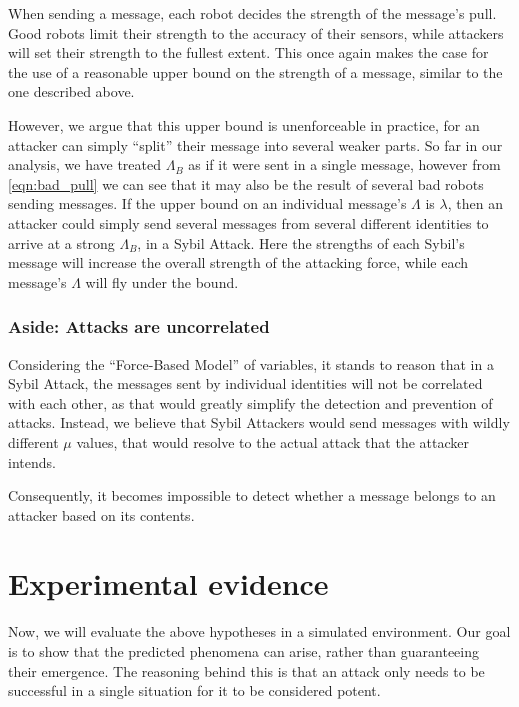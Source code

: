 When sending a message, each robot decides the strength of the message's pull. Good robots limit their strength to the accuracy of their sensors, while attackers will set their strength to the fullest extent. This once again makes the case for the use of a reasonable upper bound on the strength of a message, similar to the one described above.

However, we argue that this upper bound is unenforceable in practice, for an attacker can simply ``split'' their message into several weaker parts. So far in our analysis, we have treated $\Lambda_B$ as if it were sent in a single message, however from \autoref{eqn:bad_pull} we can see that it may also be the result of several bad robots sending messages. If the upper bound on an individual message's $\Lambda$ is $\lambda$, then an attacker could simply send several messages from several different identities to arrive at a strong $\Lambda_B$, in a Sybil Attack. Here the strengths of each Sybil's message will increase the overall strength of the attacking force, while each message's $\Lambda$ will fly under the bound.


\subsubsection{Aside: Attacks are uncorrelated} \label{hyp:uncorrelated_sybils}
Considering the ``Force-Based Model'' of variables, it stands to reason that in a Sybil Attack, the messages sent by individual identities will not be correlated with each other, as that would greatly simplify the detection and prevention of attacks. Instead, we believe that Sybil Attackers would send messages with wildly different $\mu$ values, that would resolve to the actual attack that the attacker intends.

Consequently, it becomes impossible to detect whether a message belongs to an attacker based on its contents.

\section{Experimental evidence} \label{section:attacker_experiments}

Now, we will evaluate the above hypotheses in a simulated environment. Our goal is to show that the predicted phenomena can arise, rather than guaranteeing their emergence. The reasoning behind this is that an attack only needs to be successful in a single situation for it to be considered potent.

